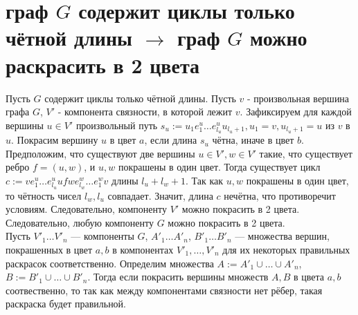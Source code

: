 \documentclass{article}
\begin{document}
    \section{граф $G$ содержит циклы только чётной длины $\rightarrow$ граф $G$ можно раскрасить в 2 цвета}
    Пусть $G$ содержит циклы только чётной длины. Пусть $v$ - произвольная вершина графа $G$, 
    $V'$ - компонента связности, в которой лежит $v$. Зафиксируем для каждой вершины $u \in V'$ произвольный 
    путь $s_u := u_1 e^u_1 \ldots e^u_{l_u} u_{l_u + 1},u_1 = v, u_{l_u + 1} = u $ из $v$ в $u$. 
    Покрасим вершину $u$ в цвет $a$, если длина $s_u$ чётна, иначе в цвет $b$. \\
    Предположим, что 
    существуют две вершины $u \in V', w \in V'$ такие, что существует ребро $f = (u, w)$, и $u, w$ покрашены в один цвет.
    Тогда существует цикл $c:= v e^u_1 \ldots e^u_{l_u} u f w e^w_{l_w} \ldots e^w_1 v $ длины $l_u + l_w + 1$. 
    Так как $u, w$ покрашены в один цвет, то чётность чисел $l_w, l_u$ совпадает. Значит, длина $c$ нечётна, что 
    противоречит условиям. Следовательно, компоненту $V'$ можно покрасить в 2 цвета. Следовательно, любую компоненту
    $G$ можно покрасить в 2 цвета.\\
     Пусть $V'_1 \ldots V'_n$ --- компоненты $G$, $A'_1 \ldots A'_n$, $B'_1 \ldots B'_n$ ---
    множества вершин, покрашенных в цвет $a, b$ в компонентах $V'_1, \ldots, V'_n$ для их некоторых
    правильных раскрасок  соответственно. Определим множества $A := A'_1 \cup \ldots \cup A'_n$, 
    $B := B'_1 \cup \ldots \cup B'_n$. Тогда если покрасить вершины множеств $A, B$ в цвета $a, b$ соотвественно, то
    так как между компонентами связности нет рёбер, такая раскраска будет правильной.
\end{document}

